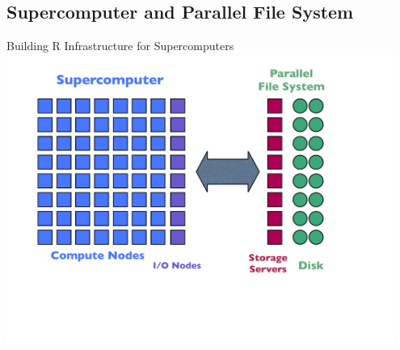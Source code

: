 \subsection{Supercomputer and Parallel File System}

\begin{frame}
  \begin{block}{Building R Infrastructure for Supercomputers}
    \includegraphics[width=0.95\textwidth]{../common/pics/hardware/SupercomputerFileSystem.pdf}
  \end{block}
\end{frame}